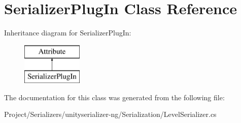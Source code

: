 \hypertarget{class_serializer_plug_in}{}\section{Serializer\+Plug\+In Class Reference}
\label{class_serializer_plug_in}
Inheritance diagram for Serializer\+Plug\+In\+:\begin{figure}[H]
\begin{center}
\leavevmode
\includegraphics[height=2.000000cm]{class_serializer_plug_in}
\end{center}
\end{figure}


The documentation for this class was generated from the following file\+:\begin{DoxyCompactItemize}
\item 
Project/\+Serializers/unityserializer-\/ng/\+Serialization/Level\+Serializer.\+cs\end{DoxyCompactItemize}
